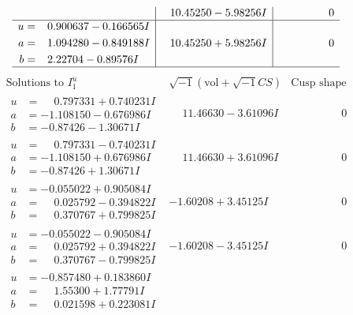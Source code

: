 \documentclass[1p]{elsarticle_modified}
\theoremstyle{definition}
\newcommand{\I}{\sqrt{-1}}
\begin{document}
$$\begin{array}{c|c|c}
 & \phantom{-}10.45250 - 5.98256 I & \phantom{-0.000000 } 0 \\ \hline\begin{aligned}
u &= \phantom{-}0.900637 - 0.166565 I \\
a &= \phantom{-}1.094280 - 0.849188 I \\
b &= \phantom{-}2.22704 - 0.89576 I\end{aligned}
 & \phantom{-}10.45250 + 5.98256 I & \phantom{-0.000000 } 0\\
 \hline 
 \end{array}$$\newpage$$\begin{array}{c|c|c}  
\text{Solutions to }I^u_{1}& \I (\text{vol} + \sqrt{-1}CS) & \text{Cusp shape}\\
 \hline 
\begin{aligned}
u &= \phantom{-}0.797331 + 0.740231 I \\
a &= -1.108150 - 0.676986 I \\
b &= -0.87426 - 1.30671 I\end{aligned}
 & \phantom{-}11.46630 - 3.61096 I & \phantom{-0.000000 } 0 \\ \hline\begin{aligned}
u &= \phantom{-}0.797331 - 0.740231 I \\
a &= -1.108150 + 0.676986 I \\
b &= -0.87426 + 1.30671 I\end{aligned}
 & \phantom{-}11.46630 + 3.61096 I & \phantom{-0.000000 } 0 \\ \hline\begin{aligned}
u &= -0.055022 + 0.905084 I \\
a &= \phantom{-}0.025792 - 0.394822 I \\
b &= \phantom{-}0.370767 + 0.799825 I\end{aligned}
 & -1.60208 + 3.45125 I & \phantom{-0.000000 } 0 \\ \hline\begin{aligned}
u &= -0.055022 - 0.905084 I \\
a &= \phantom{-}0.025792 + 0.394822 I \\
b &= \phantom{-}0.370767 - 0.799825 I\end{aligned}
 & -1.60208 - 3.45125 I & \phantom{-0.000000 } 0 \\ \hline\begin{aligned}
u &= -0.857480 + 0.183860 I \\
a &= \phantom{-}1.55300 + 1.77791 I \\
b &= \phantom{-}0.021598 + 0.223081 I\end{aligned}

\end{array}$$
\end{document}
